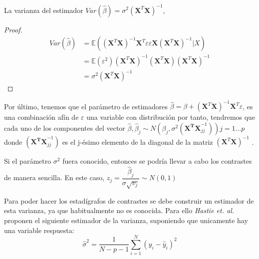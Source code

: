 \begin{propo}
La varianza del estimador $Var(\hat{\beta})= \sigma^2 (\mathbf{X}^T \mathbf{X})^{-1}$\cite{Hastie 2001},\cite{Greene 2008}
\begin{proof}
\begin{equation}
\begin{split}
Var(\hat{\beta})&=\mathbb{E}((\mathbf{X}^T \mathbf{X})^{-1}\mathbf{X}^T \varepsilon \varepsilon\mathbf{X}(\mathbf{X}^T \mathbf{X})^{-1}|X)\\
&=\mathbb{E}(\varepsilon^2) (\mathbf{X}^T \mathbf{X})^{-1}(\mathbf{X}^T \mathbf{X})(\mathbf{X}^T \mathbf{X})^{-1} \\
&=\sigma^2 (\mathbf{X}^T \mathbf{X})^{-1}
\end{split}
\end{equation}
\end{proof}
\end{propo}

\noindent Por último, tenemos que el parámetro de estimadores $\hat{\beta}= \beta+(\mathbf{X}^T\mathbf{X})^{-1}\mathbf{X}^T \varepsilon$, es una combinación afín de $\varepsilon$ una variable con distribución por tanto, tendremos que cada uno de los componentes del vector $\hat{\beta},\hat{\beta}_j\sim N(\beta_j, \sigma^2(\mathbf{X^TX}_{jj}^{-1})) j=1\ldots p$ donde $(\mathbf{X^TX}_{jj}^{-1})$ es el j-ésimo elemento de la diagonal de la matriz $(\mathbf{X}^T\mathbf{X})^{-1}$ \cite{Johnson 2007}.

\noindent Si el parámetro $\sigma^2$ fuera conocido, entonces se podría llevar a cabo los contrastes de manera sencilla. En este caso, $z_j=\dfrac{\hat{\beta}_j}{\sigma \sqrt{v_j}}\sim N(0,1)$

\noindent Para poder hacer los estadígrafos de contrastes se debe construir un estimador de esta varianza, ya que habitualmente no es conocida. Para ello \emph{Hastie et. al.} proponen el siguiente estimador de la varianza, suponiendo que unicamente hay una variable respuesta: 
\begin{equation}
\hat{\sigma}^2=\dfrac{1}{N-p-1}\sum_{i=1}^N (y_i-\hat{y}_i)^2 
\end{equation} 


